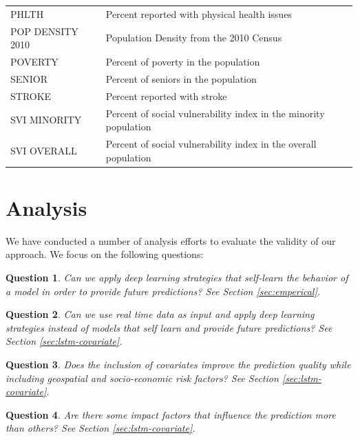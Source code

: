 \documentclass[a4paper, inpress]{jds} %
\renewcommand{\_}{%
    \textunderscore\hspace{0pt}%
}
\newtheorem{question}{Question}
\begin{document}
\begin{table}[!hptb]
{\begin{tabular}{ll}
 PHLTH        & Percent reported with physical health issues\\
 POP\_DENSITY\_2010 & Population Density from the 2010 Census\\
 POVERTY & Percent of poverty in the population\\
 SENIOR  & Percent of seniors in the population\\
 STROKE 	  & Percent reported with stroke\\
 SVI\_MINORITY 	  & Percent of social vulnerability index in the minority population\\
 SVI\_OVERALL 	  & Percent of social vulnerability index in the overall population\\
\bottomrule
\end{tabular}
}
\end{table}


\section{Analysis}

We have conducted a number of analysis efforts to evaluate the validity of our approach. We focus on the following questions:

\begin{question} \normalfont Can we apply deep learning strategies that self-learn the behavior of a model in order to provide future predictions? See Section \ref{sec:emperical}.
\label{q:1}
\end{question}

\begin{question} \normalfont Can we use real time data as input and apply deep learning strategies instead of models that self learn and provide future predictions? See Section \ref{sec:lstm-covariate}.
\label{q:2}
\end{question}

\begin{question} \normalfont Does the inclusion of covariates improve the prediction quality while including geospatial and socio-economic risk factors? See Section \ref{sec:lstm-covariate}.
\label{q:3}
\end{question}

\begin{question} \normalfont Are there some impact factors that influence the prediction more than others? See Section \ref{sec:lstm-covariate}.
\label{q:4}
\end{question}
\end{document}
